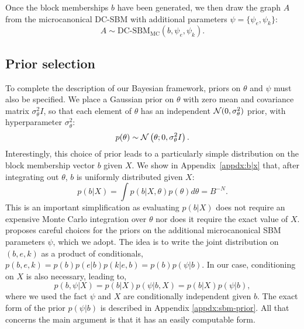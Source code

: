Once the block memberships $b$ have been generated, we then draw the 
graph $A$ from the microcanonical DC-SBM with additional parameters 
$\psi = \{\psi_e, \psi_k\}$:
%
\begin{equation}
	A \sim \textrm{DC-SBM}_{\textrm{MC}} (b, \psi_e, \psi_k).
	\label{eqn:A-generation}
\end{equation}


\subsection{Prior selection}

To complete the description of our Bayesian framework,
priors on $\theta$ and $\psi$ must also be specified. 
We place a Gaussian prior on $\theta$ with zero mean
and covariance matrix $\sigma^2_\theta I$, so that
each element of $\theta$ has an independent ${\cal N}(0,\sigma_\theta^2)$
prior, with hyperparameter $\sigma_\theta^2$:
%
\begin{equation}
	p(\theta) \sim \mathcal{N} \left( \theta ; 0, \sigma_\theta^2 I \right).
	\label{eqn:theta-prior}
\end{equation}
%
Interestingly, this choice of prior leads to a particularly
simple distribution on the block membership vector $b$ given $X$.
We show in Appendix~\ref{appdx:b|x} that,
after integrating out $\theta$,
$b$ is uniformly distributed given $X$:
%
\begin{equation}
	p(b | X) = \int p(b | X, \theta) p(\theta) d\theta = B^{-N}.
	\label{eqn:b-pseudo-prior}
\end{equation}
%
This is an important simplification as evaluating $p(b | X)$ does not require an expensive Monte Carlo integration over $\theta$ nor does it require the exact value of $X$. 
\citet{Peixoto-Bayesian-Microcanonical} proposes careful choices for 
the priors on the additional microcanonical SBM parameters $\psi$, which we adopt. 
The idea is to write the joint distribution on $(b, e, k)$ as a product of 
conditionals, $p(b, e, k) = p(b) p(e | b) p(k | e, b)= p(b) p(\psi | b)$. 
In our case, conditioning on $X$ is also necessary, leading to,
%
\begin{equation}
	p(b, \psi | X) = p(b | X) p(\psi | b, X) = p(b | X) p(\psi | b),
	\label{eqn:joint-pseudo-prior}
\end{equation}
%
where we used the fact $\psi$ and $X$ are conditionally 
independent given $b$.  The exact form of the prior
$p(\psi|b)$ is described in Appendix \ref{appdx:sbm-prior}.
All that concerns the main argument is that it has
an easily computable form.
